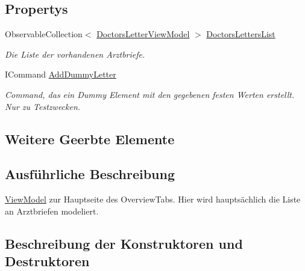 \subsection*{Propertys}
\begin{DoxyCompactItemize}
\item 
Observable\+Collection$<$ \mbox{\hyperlink{classmy_m_d_1_1_view_model_1_1_overview_tab_view_model_1_1_doctors_letter_view_model}{Doctors\+Letter\+View\+Model}} $>$ \mbox{\hyperlink{classmy_m_d_1_1_view_model_1_1_overview_tab_view_model_1_1_overview_view_model_ab0450e3df5b99c435084ad74c2ea65d0}{Doctors\+Letters\+List}}
\begin{DoxyCompactList}\small\item\em Die Liste der vorhandenen Arztbriefe. \end{DoxyCompactList}\item 
I\+Command \mbox{\hyperlink{classmy_m_d_1_1_view_model_1_1_overview_tab_view_model_1_1_overview_view_model_a82f6eaa58ba38f2761d5f6e3d9ac9518}{Add\+Dummy\+Letter}}
\begin{DoxyCompactList}\small\item\em Command, das ein Dummy Element mit den gegebenen festen Werten erstellt. Nur zu Testzwecken. \end{DoxyCompactList}\end{DoxyCompactItemize}
\subsection*{Weitere Geerbte Elemente}


\subsection{Ausführliche Beschreibung}
\mbox{\hyperlink{namespacemy_m_d_1_1_view_model}{View\+Model}} zur Hauptseite des Overview\+Tabs. Hier wird hauptsächlich die Liste an Arztbriefen modeliert. 



\subsection{Beschreibung der Konstruktoren und Destruktoren}
\mbox{\label{classmy_m_d_1_1_view_model_1_1_overview_tab_view_model_1_1_overview_view_model_a8099d87e6d22edcd5119a845cd16d96b}} 
